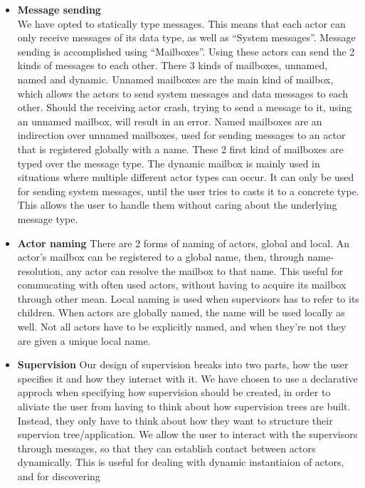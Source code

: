 \documentclass[a4paper]{article}
\begin{document}
\begin{itemize}
\item \textbf{Message sending}\\
  We have opted to statically type messages. This means that each actor can only
  receive messages of its data type, as well as ``System messages''. Message
  sending is accomplished using ``Mailboxes''. Using these actors can
  send the 2 kinds of messages to each other. There 3 kinds of mailboxes,
  unnamed, named and dynamic. Unnamed mailboxes are the main kind of mailbox,
  which allows the actors to send system messages and data messages to each
  other. Should the receiving actor crash, trying to send a message to it, using
  an unnamed mailbox, will result in an error. Named mailboxes are an
  indirection over unnamed mailboxes, used for sending messages to an actor that
  is registered globally with a name. These 2 first kind of mailboxes are typed
  over the message type. The dynamic mailbox is mainly used in situations where
  multiple different actor types can occur. %
  It can only be used for sending system messages, until the user tries to casts
  it to a concrete type. This allows the user to handle them without caring
  about the underlying message type.
\item \textbf{Actor naming}
  There are 2 forms of naming of actors, global and local. An actor's mailbox
  can be registered to a global name, then, through name-resolution, any actor
  can resolve the mailbox to that name. This useful for commucating with often
  used actors, without having to acquire its mailbox through other mean. Local
  naming is used when supervisors has to refer to its children. When actors are
  globally named, the name will be used locally as well. Not all actors have to
  be explicitly named, and when they're not they are given a unique local name.
\item \textbf{Supervision}
  Our design of supervision breaks into two parts, how the user specifies it and
  how they interact with it. We have chosen to use a declarative approch when
  specifying how supervision should be created, in order to aliviate the user
  from having to think about how supervision trees are built. Instead, they only
  have to think about how they want to structure their supervion
  tree/application. We allow the user to interact with the supervisors through
  messages, so that they can establish contact between actors dynamically. This
  is useful for dealing with dynamic instantiaion of actors, and for discovering

\end{itemize}
\end{document}
